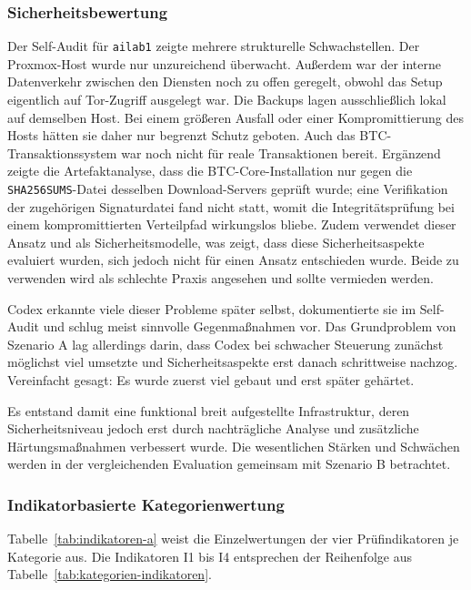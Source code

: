 \subsubsection{Sicherheitsbewertung}

Der Self-Audit für \texttt{ailab1} zeigte mehrere strukturelle Schwachstellen. Der Proxmox-Host wurde nur unzureichend überwacht. Außerdem war der interne Datenverkehr zwischen den Diensten noch zu offen geregelt, obwohl das Setup eigentlich auf Tor-Zugriff ausgelegt war. Die Backups lagen ausschließlich lokal auf demselben Host. Bei einem größeren Ausfall oder einer Kompromittierung des Hosts hätten sie daher nur begrenzt Schutz geboten. 
Auch das \ac{BTC}-Transaktionssystem war noch nicht für reale Transaktionen bereit. Ergänzend zeigte die Artefaktanalyse, dass die \ac{BTC}-Core-Installation nur gegen die \texttt{SHA256SUMS}-Datei desselben Download-Servers geprüft wurde; eine Verifikation der zugehörigen Signaturdatei fand nicht statt, womit die Integritätsprüfung bei einem kompromittierten Verteilpfad wirkungslos bliebe.
Zudem verwendet dieser Ansatz  und  als Sicherheitsmodelle, was zeigt, dass diese Sicherheitsaspekte evaluiert wurden, sich jedoch nicht für einen Ansatz entschieden wurde. Beide zu verwenden wird als schlechte Praxis angesehen und sollte vermieden werden.

Codex erkannte viele dieser Probleme später selbst, dokumentierte sie im Self-Audit und schlug meist sinnvolle Gegenmaßnahmen vor. Das Grundproblem von Szenario A lag allerdings darin, dass Codex bei schwacher Steuerung zunächst möglichst viel umsetzte und Sicherheitsaspekte erst danach schrittweise nachzog. Vereinfacht gesagt: Es wurde zuerst viel gebaut und erst später gehärtet.

Es entstand damit eine funktional breit aufgestellte Infrastruktur, deren Sicherheitsniveau jedoch erst durch nachträgliche Analyse und zusätzliche Härtungsmaßnahmen verbessert wurde. Die wesentlichen Stärken und Schwächen werden in der vergleichenden Evaluation gemeinsam mit Szenario B betrachtet.

\subsubsection{Indikatorbasierte Kategorienwertung}

Tabelle~\ref{tab:indikatoren-a} weist die Einzelwertungen der vier Prüfindikatoren je Kategorie aus. Die Indikatoren I1 bis I4 entsprechen der Reihenfolge aus Tabelle~\ref{tab:kategorien-indikatoren}.

